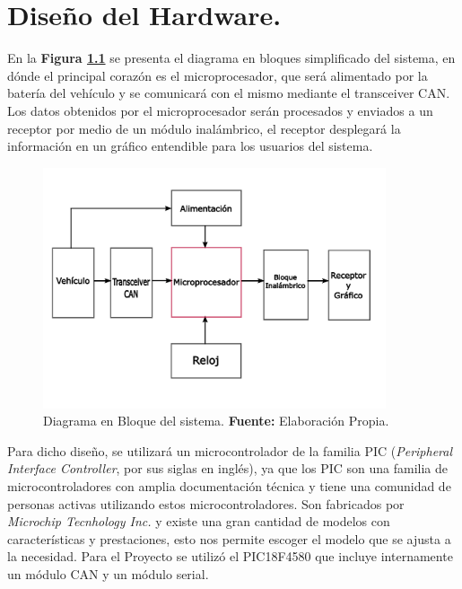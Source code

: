\chapter[Capítulo 4. Diseño del Hardware ]{Diseño del Hardware.}
En la \textbf{ Figura \ref{fig_bloque_c4}} se presenta el diagrama en bloques simplificado del sistema, en dónde el principal corazón es el microprocesador, que será alimentado por la batería del vehículo y se comunicará con el mismo mediante el transceiver CAN.  Los datos obtenidos por el microprocesador serán procesados y enviados a un receptor por medio de un módulo inalámbrico, el receptor desplegará la información en un gráfico entendible para los usuarios del sistema. 
\begin{figure}[H]
	\centering
		\includegraphics[width=0.9\textwidth]{./Cap4imagen/bloqueHardware.pdf}
	\caption[Diagrama en Bloque del sistema.]{Diagrama en Bloque del sistema.\textbf{ Fuente:}  Elaboración Propia.}
	\label{fig_bloque_c4} %
\end{figure}



Para dicho diseño, se utilizará un microcontrolador de la familia PIC (\textit{Peripheral Interface Controller}, por sus siglas en inglés), ya que los PIC son una familia de microcontroladores con amplia documentación técnica y tiene una comunidad de personas activas utilizando estos microcontroladores. Son fabricados por \textit{Microchip Tecnhology Inc.} y existe una gran cantidad de modelos con características y prestaciones, esto nos permite escoger el modelo que se ajusta a la necesidad. Para el Proyecto se utilizó el PIC18F4580 que incluye internamente un módulo CAN y un módulo serial. 

